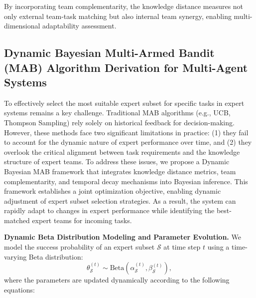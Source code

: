 By incorporating team complementarity, the knowledge distance measures not only external team-task matching but also internal team synergy, enabling multi-dimensional adaptability assessment.


\subsection{Dynamic Bayesian Multi-Armed Bandit (MAB) Algorithm Derivation for Multi-Agent Systems}
\label{sec:dynamic_bayesian}

To effectively select the most suitable expert subset for specific tasks in expert systems remains a key challenge. Traditional MAB algorithms (e.g., UCB\cite{duobi1,duobi2}, Thompson Sampling) rely solely on historical feedback for decision-making. However, these methods face two significant limitations in practice: (1) they fail to account for the dynamic nature of expert performance over time, and (2) they overlook the critical alignment between task requirements and the knowledge structure of expert teams. To address these issues, we propose a Dynamic Bayesian MAB framework that integrates knowledge distance metrics, team complementarity, and temporal decay mechanisms into Bayesian inference. This framework establishes a joint optimization objective, enabling dynamic adjustment of expert subset selection strategies. As a result, the system can rapidly adapt to changes in expert performance while identifying the best-matched expert teams for incoming tasks.

\textbf{Dynamic Beta Distribution Modeling and Parameter Evolution.} We model the success probability of an expert subset $\mathcal{S}$ at time step $t$ using a time-varying Beta distribution: 
\[
\theta_{\mathcal{S}}^{(t)} \sim \text{Beta}\left( \alpha_{\mathcal{S}}^{(t)}, \beta_{\mathcal{S}}^{(t)} \right),
\]
where the parameters are updated dynamically according to the following equations:

